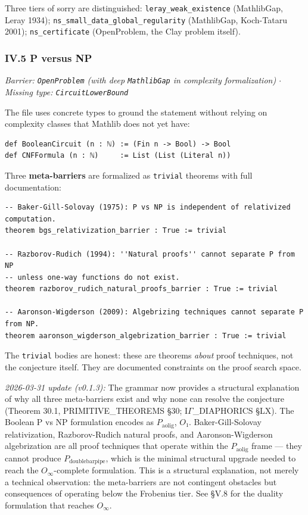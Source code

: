 \documentclass[12pt,a4paper]{article}
\newcommand{\pilcrow}{\S}
\begin{document}
Three tiers of sorry are distinguished: \texttt{leray\_weak\_existence} (MathlibGap, Leray 1934); \texttt{ns\_small\_data\_global\_regularity} (MathlibGap, Koch-Tataru 2001); \texttt{ns\_certificate} (OpenProblem, the Clay problem itself).

\subsubsection{IV.5 P versus NP}

\emph{Barrier: \texttt{OpenProblem} (with deep \texttt{MathlibGap} in complexity formalization) $\cdot$ Missing type: \texttt{CircuitLowerBound \epsilon}}

The file uses concrete types to ground the statement without relying on complexity classes that Mathlib does not yet have:

\begin{lstlisting}[language=lean]
def BooleanCircuit (n : ℕ) := (Fin n -> Bool) -> Bool
def CNFFormula (n : ℕ)     := List (List (Literal n))
\end{lstlisting}

Three \textbf{meta-barriers} are formalized as \texttt{trivial} theorems with full documentation:

\begin{lstlisting}[language=lean]
-- Baker-Gill-Solovay (1975): P vs NP is independent of relativized computation.
theorem bgs_relativization_barrier : True := trivial

-- Razborov-Rudich (1994): ''Natural proofs'' cannot separate P from NP
-- unless one-way functions do not exist.
theorem razborov_rudich_natural_proofs_barrier : True := trivial

-- Aaronson-Wigderson (2009): Algebrizing techniques cannot separate P from NP.
theorem aaronson_wigderson_algebrization_barrier : True := trivial
\end{lstlisting}

The \texttt{trivial} bodies are honest: these are theorems \emph{about} proof techniques, not the conjecture itself. They are documented constraints on the proof search space.

\emph{2026-03-31 update (v0.1.3):} The grammar now provides a structural explanation of why all three meta-barriers exist and why none can resolve the conjecture (Theorem 30.1, PRIMITIVE\_THEOREMS \pilcrow{}30; I$\Gamma$\_DIAPHORICS \pilcrow{}LX). The Boolean P vs NP formulation encodes as $P_{\text{aolig}}$, $O₁$. Baker-Gill-Solovay relativization, Razborov-Rudich natural proofs, and Aaronson-Wigderson algebrization are all proof techniques that operate within the $P_{\text{aolig}}$ frame --- they cannot produce $P_{\text{doublebarpipe}}$, which is the minimal structural upgrade needed to reach the $O_{\infty}$-complete formulation. This is a structural explanation, not merely a technical observation: the meta-barriers are not contingent obstacles but consequences of operating below the Frobenius tier. See \pilcrow{}V.8 for the duality formulation that reaches $O_{\infty}$.
\end{document}
